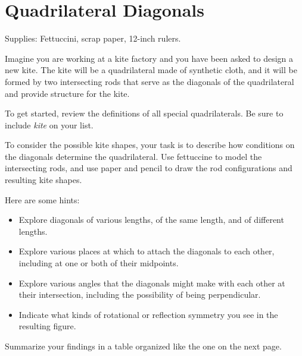\newpage

\section{Quadrilateral Diagonals}
\begin{teachingnote}
Supplies:  Fettuccini, scrap paper, 12-inch rulers.
\end{teachingnote}

Imagine you are working at a kite factory and you have been asked to design a new kite.  The kite will be a quadrilateral made of synthetic cloth, and it will be formed by two intersecting rods that serve as the diagonals of the quadrilateral and provide structure for the kite.  

\begin{prob}
To get started, review the definitions of all special quadrilaterals.  Be sure to include \emph{kite} on your list.  
\end{prob}

\begin{prob}
To consider the possible kite shapes, your task is to describe how conditions on the diagonals determine the quadrilateral.  Use fettuccine to model the intersecting rods, and use paper and pencil to draw the rod configurations and resulting kite shapes.  

Here are some hints:  

\begin{itemize}
\item Explore diagonals of various lengths, of the same length, and of different lengths.  
\item Explore various places at which to attach the diagonals to each other, including at one or both of their midpoints.  
\item Explore various angles that the diagonals might make with each other at their intersection, including the possibility of being perpendicular.  
\item Indicate what kinds of rotational or reflection symmetry you see in the resulting figure.
\end{itemize}
\end{prob}

\begin{prob}
Summarize your findings in a table organized like the one on the next page.  
\end{prob}

\newpage 

